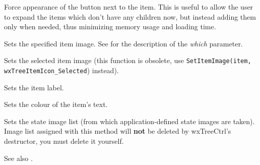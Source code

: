 Force appearance of the button next to the item. This is useful to
allow the user to expand the items which don't have any children now,
but instead adding them only when needed, thus minimizing memory
usage and loading time.


\label{wxtreectrlsetitemimage}


Sets the specified item image. See 
for the description of the {\it which} parameter.


\label{wxtreectrlsetitemselectedimage}


Sets the selected item image (this function is obsolete, use {\tt SetItemImage(item, wxTreeItemIcon\_Selected}) instead).


\label{wxtreectrlsetitemtext}


Sets the item label.


\label{wxtreectrlsetitemtextcolour}


Sets the colour of the item's text.


\label{wxtreectrlsetstateimagelist}


Sets the state image list (from which application-defined state images are taken).
Image list assigned with this method will
{\bf not} be deleted by wxTreeCtrl's destructor, you must delete it yourself.

See also .

\label{wxtreectrlsetwindowstyle}


